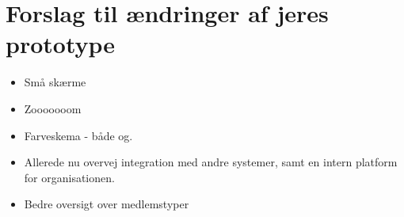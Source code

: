 \section{Forslag til ændringer af jeres prototype}

\begin{itemize}
\item Små skærme
\item Zooooooom
\item Farveskema - både og.
\item Allerede nu overvej integration med andre systemer, samt en intern
platform for organisationen.
\item Bedre oversigt over medlemstyper
\end{itemize}
